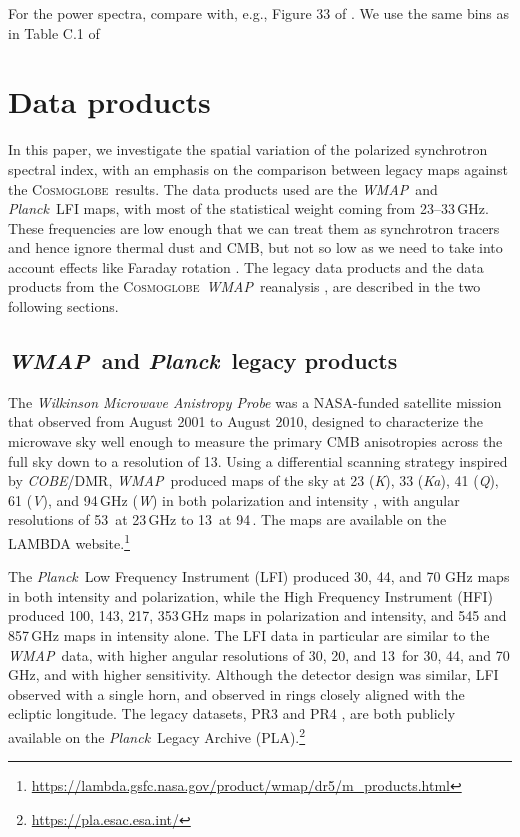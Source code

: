 \documentclass[twocolumn]{../../common/aa}
\def\WMAP{\emph{WMAP}}
\def\COBE{\emph{COBE}}
\def\Planck{\emph{Planck}}
\newcommand{\cosmoglobe}{\textsc{Cosmoglobe}}
\newcommand{\K}[0]{\textit K}
\newcommand{\Ka}[0]{\textit{Ka}}
\newcommand{\Q}[0]{\textit Q}
\newcommand{\V}[0]{\textit V}
\newcommand{\W}[0]{\textit W}
\begin{document}
For the power spectra, compare with, e.g., Figure 33 of \citet{planck2016-l04}. We use the same bins as in Table C.1 of \citet{planck2016-l11A}




\section{Data products}
\label{sec:data}

In this paper, we investigate the spatial variation of the polarized synchrotron spectral index, with an emphasis on the comparison between  legacy maps against the \cosmoglobe\ results. The data products used are the \WMAP\ and \Planck\ LFI maps, with most of the statistical weight coming from 23--33\,GHz. These frequencies are low enough that we can treat them as synchrotron tracers and hence ignore thermal dust and CMB, but not so low as we need to take into account effects like Faraday rotation \citep{fuskeland:2019}. The legacy data products and the data products from the \cosmoglobe\ \WMAP\ reanalysis \citep{watts2023_dr1}, are described in the two following sections.


\subsection{\WMAP\ and \Planck\ legacy products}
\label{sec:wmap_data}

The \textit{Wilkinson Microwave Anistropy Probe} \citep[\WMAP]{bennett2012} was a NASA-funded satellite mission that observed from August 2001 to August 2010, designed to characterize the microwave sky well enough to measure the primary CMB anisotropies across the full sky down to a resolution of 13\arcm. Using a differential scanning strategy inspired by \COBE/DMR,
\WMAP\ produced maps of the sky at 23 (\K), 33 (\Ka), 41 (\Q), 61 (\V), and 94\,GHz (\W) in both polarization and intensity \citep{bennett2012}, with angular resolutions of 53\arcm\ at 23\,GHz to 13\arcm\ at 94\,\GHz. 
The maps are available on the LAMBDA website.\footnote{\url{https://lambda.gsfc.nasa.gov/product/wmap/dr5/m_products.html}} 

The \Planck\ Low Frequency Instrument (LFI) produced  30, 44, and 70 GHz maps in both intensity and polarization, while the High Frequency Instrument (HFI) produced 100, 143, 217, 353\,GHz maps in polarization and intensity, and 545 and 857\,GHz maps in intensity alone. The LFI data in particular are similar to the \WMAP\ data, with higher angular resolutions of 30\arcm, 20\arcm, and 13\arcm\ for 30, 44, and 70 GHz, and with higher sensitivity. Although the detector design was similar, LFI observed with a single horn, and observed in rings closely aligned with the ecliptic longitude. The legacy datasets, PR3 \citep{planck2016-l01} and PR4 \citep{planck2020-LVII}, are both publicly available on the \Planck\ Legacy Archive (PLA).\footnote{\url{https://pla.esac.esa.int/}}
\end{document}
